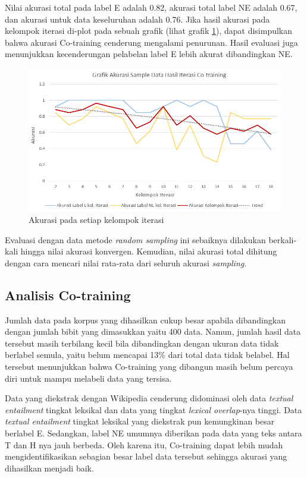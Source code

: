 \noindent Nilai akurasi total pada label E adalah 0.82, akurasi total label NE adalah 0.67, dan akurasi untuk data keseluruhan adalah 0.76. Jika hasil akurasi pada kelompok iterasi di-plot pada sebuah grafik (lihat grafik \ref{pic:akurasi-iterasi}), dapat disimpulkan bahwa akurasi Co-training cenderung mengalami penurunan. Hasil evaluasi juga menunjukkan kecenderungan pelabelan label E lebih akurat dibandingkan NE.
\begin{figure}
	\centering
	\includegraphics[width=1\linewidth]{pics/grafik-akurasi}
	\caption{Akurasi pada setiap kelompok iterasi}
	\label{pic:akurasi-iterasi}
\end{figure}
Evaluasi dengan data metode \textit{random sampling} ini sebaiknya dilakukan berkali-kali hingga nilai akurasi konvergen. Kemudian, nilai akurasi total dihitung dengan cara mencari nilai rata-rata dari seluruh akurasi \textit{sampling}. 

\subsection{Analisis Co-training}
Jumlah data pada korpus yang dihasilkan cukup besar apabila dibandingkan dengan jumlah bibit yang dimasukkan yaitu 400 data. Namun, jumlah hasil data tersebut masih terbilang kecil bila dibandingkan dengan ukuran data tidak berlabel semula, yaitu belum mencapai 13\% dari total data tidak belabel. Hal tersebut menunjukkan bahwa Co-training yang dibangun masih belum percaya diri untuk mampu melabeli data yang tersisa. 

Data yang diekstrak dengan Wikipedia cenderung didominasi oleh data \textit{textual entailment} tingkat leksikal dan data yang tingkat \textit{lexical overlap}-nya tinggi. Data \textit{textual entailment} tingkat leksikal yang diekstrak pun kemungkinan besar berlabel E. Sedangkan, label NE umumnya diberikan pada data yang teks antara T dan H nya jauh berbeda. Oleh karena itu, Co-training dapat lebih mudah mengidentifikasikan sebagian besar label data tersebut sehingga akurasi yang dihasilkan menjadi baik. 

